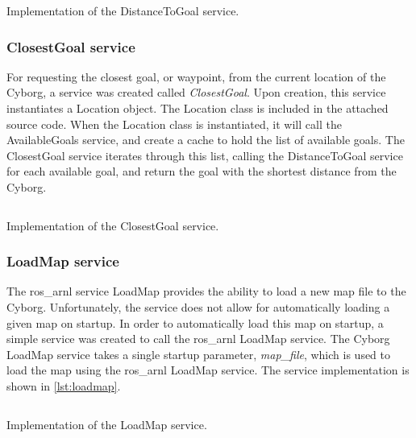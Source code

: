 \documentclass[\rootfolder/main.tex]{subfiles}
\begin{document}
\begin{listing}
    \inputminted[fontsize=\scriptsize]{python}{\rootfolder/Chapters/Chapter6/Listings/distance_to_goal.py}
    \caption{Implementation of the DistanceToGoal service.}
    \label{lst:distancetogoal}
\end{listing}

\subsubsection{ClosestGoal service}

For requesting the closest goal, or waypoint, from the current location of the Cyborg, a service was created called \emph{ClosestGoal}.
Upon creation, this service instantiates a Location object.
The Location class is included in the attached source code.
When the Location class is instantiated, it will call the AvailableGoals service, and create a cache to hold the list of available goals.
The ClosestGoal service iterates through this list, calling the DistanceToGoal service for each available goal, and return the goal with the shortest distance from the Cyborg.

\begin{listing}
    \inputminted[fontsize=\scriptsize]{python}{\rootfolder/Chapters/Chapter6/Listings/closest_goal.py}
    \caption{Implementation of the ClosestGoal service.}
    \label{lst:closestgoal}
\end{listing}

\subsubsection{LoadMap service}

The ros\_arnl service LoadMap provides the ability to load a new map file to the Cyborg.
Unfortunately, the service does not allow for automatically loading a given map on startup.
In order to automatically load this map on startup, a simple service was created to call the ros\_arnl LoadMap service.
The Cyborg LoadMap service takes a single startup parameter, \emph{map\_file}, which is used to load the map using the ros\_arnl LoadMap service.
The service implementation is shown in \cref{lst:loadmap}.

\begin{listing}
    \inputminted[fontsize=\scriptsize]{python}{\rootfolder/Chapters/Chapter6/Listings/load_map.py}
    \caption{Implementation of the LoadMap service.}
    \label{lst:loadmap}
\end{listing}
\end{document}
